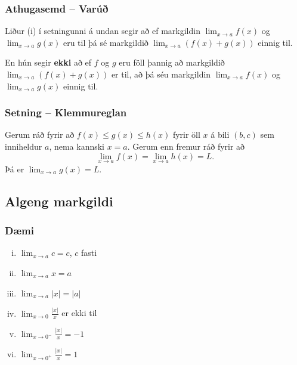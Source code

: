 \documentclass[icelandic,a4paper,12pt]{article}
\begin{document}
\subsubsection{Athugasemd -- Varúð}
Liður (i) í setningunni á undan segir að ef markgildin
$\lim_{x\to a} f(x)$ og $\lim_{x\to a} g(x)$ eru til þá
sé markgildið $\lim_{x\to a} (f(x)+g(x))$ einnig til.

\pause
En hún segir {\bf ekki} að ef 
$f$ og $g$ eru föll þannig að markgildið
$\lim_{x\to a} (f(x)+g(x))$ er til, að þá séu markgildin
$\lim_{x\to a} f(x)$ og $\lim_{x\to a} g(x)$ einnig til.

\subsubsection{Setning -- Klemmureglan}Gerum ráð fyrir að $f(x)\leq
g(x)\leq h(x)$ fyrir öll $x$ á bili $(b, c)$ sem
inniheldur $a$, nema kannski $x=a$.  Gerum enn fremur ráð fyrir að 
$$\lim_{x\rightarrow a}f(x)=\lim_{x\rightarrow a}h(x)=L.$$
Þá er $\lim_{x\rightarrow a}g(x)=L$.


\subsection{Algeng markgildi}
\subsubsection{Dæmi}
\begin{enumerate}[(i)] 
  \item $\lim_{x \to a} c = c$, $c$ fasti
\pause
  \item $\lim_{x \to a} x = a$
  \item $\lim_{x \to a} |x| = |a|$
\pause
  \item $\lim_{x \to 0} \frac{|x|}{x}$ er ekki til
\pause
  \item $\lim_{x \to 0^-} \frac{|x|}{x} = -1$
  \item $\lim_{x \to 0^+} \frac{|x|}{x} = 1$
\end{enumerate}
 
\end{document}

